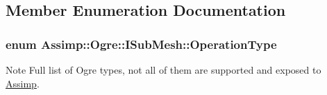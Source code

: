 \subsection{Member Enumeration Documentation}
\hypertarget{class_assimp_1_1_ogre_1_1_i_sub_mesh_a430f1cb3dbd9d5043ed751f8810ee0a5}{
\subsubsection[{Operation\+Type}]{\setlength{\rightskip}{0pt plus 5cm}enum {\bf Assimp\+::\+Ogre\+::\+I\+Sub\+Mesh\+::\+Operation\+Type}}}\label{class_assimp_1_1_ogre_1_1_i_sub_mesh_a430f1cb3dbd9d5043ed751f8810ee0a5}
\begin{DoxyNote}{Note}
Full list of Ogre types, not all of them are supported and exposed to \hyperlink{class_assimp}{Assimp}. 
\end{DoxyNote}
